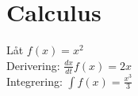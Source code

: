 \section{Calculus}
Låt
\begin{math}
    f(x) = x^2
\end{math} \\[2pt]

Derivering: 
\begin{math}
    \frac{dx}{dt} f(x) = 2x
\end{math} \\[2pt]

Integrering: 
\begin{math}
    \int f(x) = \frac{x^3}{3}
\end{math} \\[2pt]